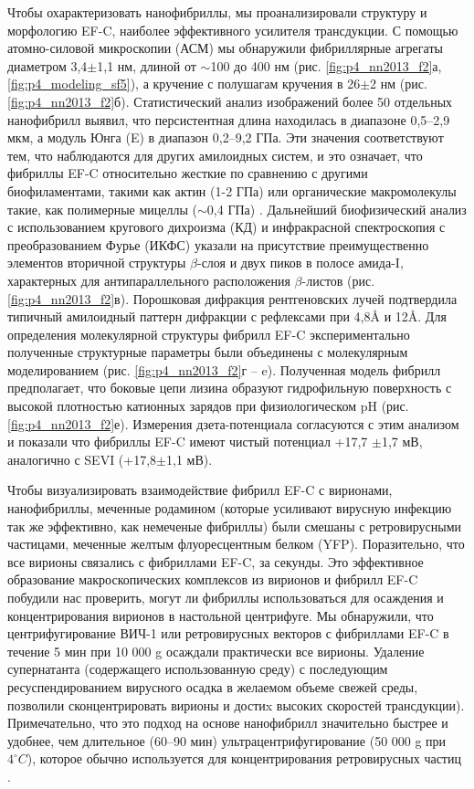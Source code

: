     Чтобы охарактеризовать нанофибриллы, мы проанализировали структуру и морфологию EF-C, наиболее эффективного усилителя трансдукции. С помощью атомно-силовой микроскопии (АСМ) мы обнаружили фибриллярные агрегаты диаметром 3,4$\pm$1,1 нм, длиной от $\sim$100 до 400 нм (рис. \ref{fig:p4_nn2013_f2}а, \ref{fig:p4_modeling_sf5}), а кручение с полушагам кручения в 26$\pm$2 нм (рис. \ref{fig:p4_nn2013_f2}б). Статистический анализ изображений более 50 отдельных нанофибрилл выявил, что персистентная длина находилась в диапазоне 0,5–2,9 мкм, а модуль Юнга (E) в диапазон 0,2–9,2 ГПа. Эти значения соответствуют тем, что наблюдаются для других амилоидных систем, и это означает, что фибриллы EF-C относительно жесткие по сравнению с другими биофиламентами, такими как актин (1-2 ГПа) или органические макромолекулы такие, как полимерные мицеллы ($\sim$0,4 ГПа) \cite{knowles_nanomechanics_2011,dalhaimer_single_2003}. Дальнейший биофизический анализ с использованием кругового дихроизма (КД) и инфракрасной спектроскопия с преобразованием Фурье (ИКФС) указали на присутствие преимущественно элементов вторичной структуры $\beta$-слоя и двух пиков в полосе амида-I, характерных для антипараллельного расположения $\beta$-листов \cite{cerf_antiparallel_2009} (рис. \ref{fig:p4_nn2013_f2}в). Порошковая дифракция рентгеновских лучей подтвердила типичный амилоидный паттерн дифракции с рефлексами при 4,8\AA{} и 12\AA. Для определения молекулярной структуры фибрилл EF-C экспериментально полученные структурные параметры были объединены с молекулярным моделированием \cite{shaytan_self-assembling_2011} (рис. \ref{fig:p4_nn2013_f2}г – e). Полученная модель фибрилл предполагает, что боковые цепи лизина образуют гидрофильную поверхность с высокой плотностью катионных зарядов при физиологическом pH (рис. \ref{fig:p4_nn2013_f2}е). Измерения дзета-потенциала согласуются с этим анализом и показали что фибриллы EF-C имеют чистый потенциал +17,7 $\pm$1,7 мВ, аналогично с SEVI (+17,8$\pm$1,1 мВ).
    
    Чтобы визуализировать взаимодействие фибрилл EF-C с вирионами, нанофибриллы, меченные родамином (которые усиливают вирусную инфекцию так же эффективно, как немеченые фибриллы) были смешаны с ретровирусными частицами, меченные желтым флуоресцентным белком (YFP). Поразительно, что все вирионы связались с фибриллами EF-C, за секунды. Это эффективное образование макроскопических комплексов из вирионов и фибрилл EF-C побудили нас проверить, могут ли фибриллы использоваться для осаждения и концентрирования вирионов в настольной центрифуге. Мы обнаружили, что центрифугирование ВИЧ-1 или ретровирусных векторов с фибриллами EF-C в течение 5 мин при 10 000 g осаждали практически все вирионы. Удаление супернатанта (содержащего использованную среду) с последующим ресуспендированием вирусного осадка в желаемом объеме свежей среды, позволили сконцентрировать вирионы и достиx высоких скоростей трансдукции). Примечательно, что это подход на основе нанофибрилл значительно быстрее и удобнее, чем длительное (60–90 мин) ультрацентрифугирование (50 000 g при $4^{\circ}C$), которое обычно используется для концентрирования ретровирусных частиц \cite{tiscornia_production_2006}.
    
